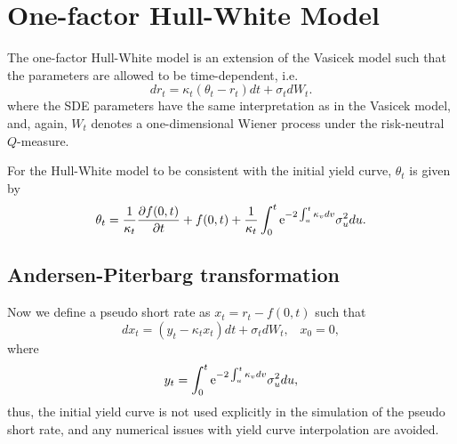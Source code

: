 \section{One-factor Hull-White Model}
The one-factor Hull-White model \cite{Hull1990} is an extension of the Vasicek model such that the parameters are allowed to be time-dependent, i.e.
\begin{equation}
dr_t = \kappa_t \left( \theta_t - r_t \right) dt + \sigma_t dW_t. \label{eq:HullWhiteSDE}
\end{equation}
where the SDE parameters have the same interpretation as in the Vasicek model, and, again, $W_t$ denotes a one-dimensional Wiener process under the risk-neutral $Q$-measure.

For the Hull-White model to be consistent with the initial yield curve, $\theta_t$ is given by \cite{Andersen2010}
\begin{equation}
\theta_t = \frac{1}{\kappa_t} \frac{\partial f(0,t)}{\partial t} + f(0,t) + \frac{1}{\kappa_t} \int_0^t \text{e}^{-2\int_u^t \kappa_v dv} \sigma_u^2 du.
\end{equation}

\subsection{Andersen-Piterbarg transformation}
Now we define a pseudo short rate as $x_t = r_t - f(0,t)$ such that
\begin{equation}
dx_t = \left( y_t - \kappa_t x_t \right) dt + \sigma_t dW_t, \;\;\; x_0 = 0,
\label{eq:HullWhiteSDEx}
\end{equation}
where
\begin{equation}
y_t = \int_0^t \text{e}^{-2\int_u^t \kappa_v dv} \sigma_u^2 du,
\end{equation}
thus, the initial yield curve is not used explicitly in the simulation of the pseudo 
short rate, and any numerical issues with yield curve interpolation are avoided.

